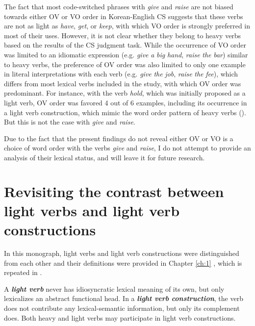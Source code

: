 The fact that most code-switched phrases with \textit{give} and \textit{raise} are not biased towards either \ac{OV} or \ac{VO} order in Korean-English \ac{CS} suggests that these verbs are not as light as \textit{have}, \textit{get}, or \textit{keep}, with which \ac{VO} order is strongly preferred in most of their uses. However, it is not clear whether they belong to heavy verbs based on the results of the \ac{CS} judgment task. While the occurrence of \ac{VO} order was limited to an idiomatic expression (e.g. \textit{give} \textit{a} \textit{big} \textit{hand}, \textit{raise} \textit{the} \textit{bar}) similar to heavy verbs, the preference of \ac{OV} order was also limited to only one example in literal interpretations with each verb (e.g. \textit{give} \textit{the} \textit{job}, \textit{raise} \textit{the} \textit{fee}), which differs from most lexical verbs included in the study, with which \ac{OV} order was predominant. For instance, with the verb \textit{hold}, which was initially proposed as a light verb, \ac{OV} order was favored 4 out of 6 examples, including its occurrence in a light verb construction, which mimic the word order pattern of heavy verbs (). But this is not the case with \textit{give} and \textit{raise}.


Due to the fact that the present findings do not reveal either \ac{OV} or \ac{VO} is a choice of word order with the verbs \textit{give} and \textit{raise}, I do not attempt to provide an analysis of their lexical status, and will leave it for future research. 

\section{Revisiting the contrast between light verbs and light verb constructions}\label{ch5:sect:5.8}

In this monograph, light verbs and light verb constructions were distinguished from each other and their definitions were provided in Chapter \ref{ch:1} , which is repeated in .

\ea\label{ex:140}
    \ea A \textbf{\textit{light verb}} never has idiosyncratic lexical meaning of its own, but only lexicalizes an abstract functional head. 
    \ex  In a \textbf{\textit{light} \textit{verb} \textit{construction}}, the verb does not contribute any lexical-semantic information, but only its complement does. Both heavy and light verbs may participate in light verb constructions.
    \z\z
    
